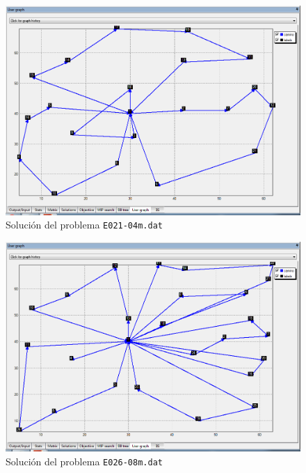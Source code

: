 \documentclass[a4paper,11pt]{article}
\begin{document}
\begin{figure}[!htbp]
	\centering
	\includegraphics[width=1.0\textwidth, height=0.4\textheight]{e021_redes.png}
    \caption{Solución del problema \texttt{E021-04m.dat}}
\end{figure}

\begin{figure}[!htbp]
	\centering
	\includegraphics[width=1.0\textwidth, height=0.4\textheight]{e026_redes.png}
    \caption{Solución del problema \texttt{E026-08m.dat}}
\end{figure}
\end{document}
